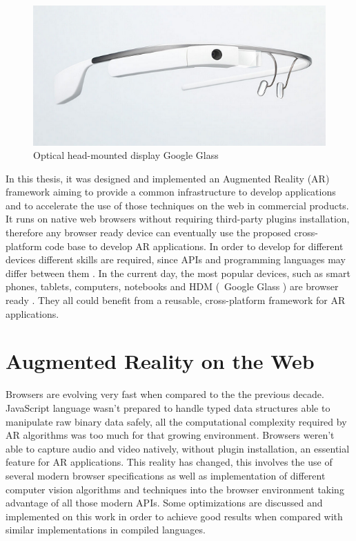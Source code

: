 \begin{figure}[!htb]
  \centering
  \includegraphics[width=\linewidth]{chapters/basic_concepts/google_glass.png}
  \caption{Optical head-mounted display Google Glass \cite{Glass2013}}
  \label{figure:google_glass}
\end{figure}

In this thesis, it was designed and implemented an Augmented Reality (AR) framework aiming to provide a common infrastructure to develop applications and to accelerate the use of those techniques on the web in commercial products. It runs on native web browsers without requiring third-party plugins installation, therefore any browser ready device can eventually use the proposed cross-platform code base to develop AR applications. In order to develop for different devices different skills are required, since APIs and programming languages may differ between them \cite{MDN2013,International2009}. In the current day, the most popular devices, such as smart phones, tablets, computers, notebooks and HDM (\ie\ Google Glass \cite{Glass2013}) \cite{Benford1998} are browser ready \cite{Hickson2013}. They all could benefit from a reusable, cross-platform framework for AR applications.


\section{Augmented Reality on the Web} %
\label{sec:basic_concepts:augmented_reality_on_the_web}

Browsers are evolving very fast when compared to the the previous decade. JavaScript language wasn't prepared to handle typed data structures able to manipulate raw binary data safely, all the computational complexity required by AR algorithms was too much for that growing environment. Browsers weren't able to capture audio and video natively, without plugin installation, an essential feature for AR applications. This reality has changed, this involves the use of several modern browser specifications as well as implementation of different computer vision algorithms and techniques into the browser environment taking advantage of all those modern APIs. Some optimizations are discussed and implemented on this work in order to achieve good results when compared with similar implementations in compiled languages.

